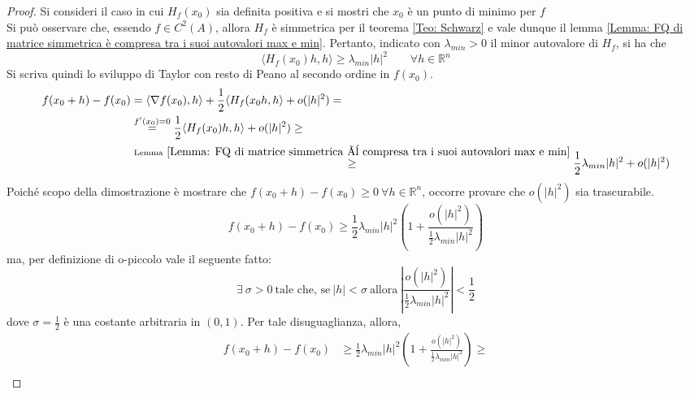     \begin{proof}
        Si consideri il caso in cui $H_f(x_0)$ sia definita positiva e si mostri che $x_0$ è un punto di minimo per $f$\\
        Si può osservare che, essendo $f \in C^2(A)$, allora $H_f$ è simmetrica per il teorema \ref{Teo: Schwarz} e vale dunque il lemma \ref{Lemma: FQ di matrice simmetrica è compresa tra i suoi autovalori max e min}. Pertanto, indicato con $\lambda_{min}>0$ il minor autovalore di $H_f$, si ha che
        \begin{equation}
            \langle H_f(x_0)h,h \rangle \geq \lambda_{min} |h|^2 \qquad \forall h \in \mathbb{R}^n
        \end{equation}
        Si scriva quindi lo sviluppo di Taylor con resto di Peano al secondo ordine in $f(x_0)$.
        \begin{equation}
        \begin{aligned}
            f(x_0+h)-f(x_0)&= \langle \nabla f(x_0), h \rangle + \frac{1}{2}\langle H_f(x_0h, h\rangle + o(|h|^2)=\\
            &\overset{f'(x_0)=0}{=} \frac{1}{2}\langle H_f(x_0)h, h\rangle + o(|h|^2) \geq \\
            &\overset{\text{Lemma}\ \ref{Lemma: FQ di matrice simmetrica è compresa tra i suoi autovalori max e min}}{\geq} \frac{1}{2} \lambda_{min}|h|^2+o(|h|^2)
        \end{aligned}
        \end{equation}
        Poiché scopo della dimostrazione è mostrare che $f(x_0+h)-f(x_0) \geq 0\ \forall h \in \mathbb{R}^n$, occorre provare che $o(|h|^2)$ sia trascurabile.
        \begin{equation}
            f(x_0+h)- f(x_0) \geq \frac{1}{2}\lambda_{min} |h|^2 \left( 1 + \frac{o(|h|^2)}{\tfrac{1}{2}\lambda_{min}|h|^2}\right)
        \end{equation}
        ma, per definizione di o-piccolo vale il seguente fatto:
        \begin{equation}
            \exists\ \sigma >0\ \text{tale che, se}\ |h|<\sigma\ \text{allora}\ \left|\frac{o(|h|^2)}{\tfrac{1}{2}\lambda_{min} |h|^2}\right| < \frac{1}{2}
        \end{equation}
        dove $\sigma=\frac{1}{2}$ è una costante arbitraria in $(0,1)$.
        Per tale disuguaglianza, allora, 
        \begin{equation}
        \begin{aligned}
            f(x_0+h)-f(x_0)&\geq \frac{1}{2}\lambda_{min} |h|^2 \left( 1 + \frac{o(|h|^2)}{\tfrac{1}{2}\lambda_{min}|h|^2}\right) \geq \\

\end{aligned}
\end{equation}
\end{proof}
